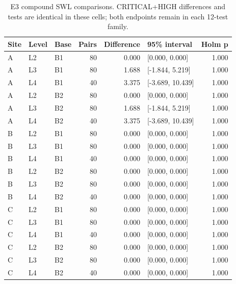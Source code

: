 \begin{table}[H]\centering\footnotesize
\caption{E3 compound SWL comparisons. CRITICAL+HIGH differences and tests are identical in these cells; both endpoints remain in each 12-test family.}\label{tab:e3_tests}
\begin{tabularx}{\textwidth}{@{}lllrrYr@{}}\toprule
Site & Level & Base & Pairs & Difference & 95\% interval & Holm p \\\midrule
A & L2 & B1 & 80 & 0.000 & [0.000, 0.000] & 1.000 \\
A & L3 & B1 & 80 & 1.688 & [-1.844, 5.219] & 1.000 \\
A & L4 & B1 & 40 & 3.375 & [-3.689, 10.439] & 1.000 \\
A & L2 & B2 & 80 & 0.000 & [0.000, 0.000] & 1.000 \\
A & L3 & B2 & 80 & 1.688 & [-1.844, 5.219] & 1.000 \\
A & L4 & B2 & 40 & 3.375 & [-3.689, 10.439] & 1.000 \\
B & L2 & B1 & 80 & 0.000 & [0.000, 0.000] & 1.000 \\
B & L3 & B1 & 80 & 0.000 & [0.000, 0.000] & 1.000 \\
B & L4 & B1 & 40 & 0.000 & [0.000, 0.000] & 1.000 \\
B & L2 & B2 & 80 & 0.000 & [0.000, 0.000] & 1.000 \\
B & L3 & B2 & 80 & 0.000 & [0.000, 0.000] & 1.000 \\
B & L4 & B2 & 40 & 0.000 & [0.000, 0.000] & 1.000 \\
C & L2 & B1 & 80 & 0.000 & [0.000, 0.000] & 1.000 \\
C & L3 & B1 & 80 & 0.000 & [0.000, 0.000] & 1.000 \\
C & L4 & B1 & 40 & 0.000 & [0.000, 0.000] & 1.000 \\
C & L2 & B2 & 80 & 0.000 & [0.000, 0.000] & 1.000 \\
C & L3 & B2 & 80 & 0.000 & [0.000, 0.000] & 1.000 \\
C & L4 & B2 & 40 & 0.000 & [0.000, 0.000] & 1.000 \\
\bottomrule\end{tabularx}\end{table}